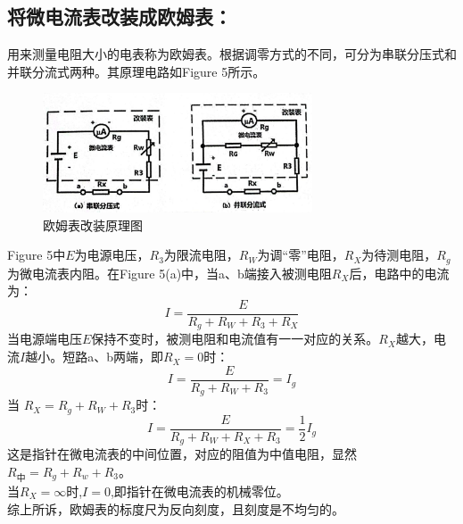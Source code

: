 \documentclass{article}
\begin{document}
\subsection{将微电流表改装成欧姆表：}
\hspace*{2em}用来测量电阻大小的电表称为欧姆表。根据调零方式的不同，可分为串联分压式和并联分流式两种。其原理电路如Figure 5所示。
\begin{figure}[h]
    \centering
    \includegraphics[width=8cm]{1.5.png}
    \caption{欧姆表改装原理图}
\end{figure}
\hspace*{2em}Figure 5中$E$为电源电压，$R_3$为限流电阻，$R_W$为调“零”电阻，$R_X$为待测电阻，$R_g$为微电流表内阻。在Figure 5(a)中，当a、b端接入被测电阻$R_X$后，电路中的电流为：
$$
I=\frac{E}{R_g+R_W+R_3+R_X}
$$
\hspace*{2em}当电源端电压$E$保持不变时，被测电阻和电流值有一一对应的关系。$R_X$越大，电流$I$越小。短路a、b两端，即$R_X=0$时：
$$
I=\frac{E}{R_g+R_W+R_3}=I_g
$$
当 $R_X=R_g+R_W+R_3$时：
$$
I=\frac{E}{R_g+R_W+R_X+R_3}=\frac{1}{2}I_g
$$
这是指针在微电流表的中间位置，对应的阻值为中值电阻，显然$R_{中}=R_g+R_w+R_3$。\\
\hspace*{2em}当$R_X=\infty $时,$I=0$,即指针在微电流表的机械零位。\\
\hspace*{2em}综上所诉，欧姆表的标度尺为反向刻度，且刻度是不均匀的。
\end{document}
